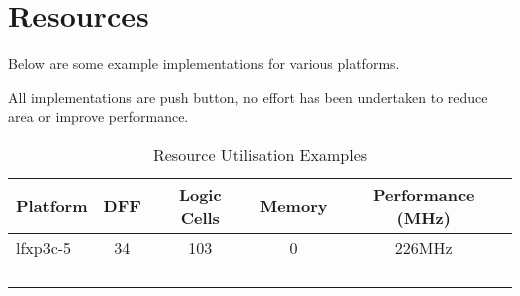 \chapter{Resources}\label{resources}

Below are some example implementations for various platforms.

All implementations are push button, no effort has been undertaken to
reduce area or improve performance.

\setlength\LTleft{0pt}
\setlength\LTright{0pt}

\begin{longtable}[]{@{\extracolsep{\fill}}lcccc@{}}
\toprule
Platform & DFF & Logic Cells & Memory & Performance (MHz)\tabularnewline
\midrule
\endhead
lfxp3c-5 & 34 & 103 & 0 & 226MHz\tabularnewline
& & & &\tabularnewline
& & & &\tabularnewline
& & & &\tabularnewline
\bottomrule
\caption{Resource Utilisation Examples}
\end{longtable}